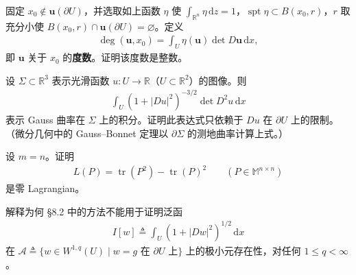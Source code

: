 \documentclass[../../main.tex]{subfiles}
\begin{document}
\begin{exercise}[续上题]\label{exercise:ch08-7-5}固定 $x_0\notin\mathbf{u}(\partial U)$，并选取如上函数 $\eta$ 使 $\int_{\mathbb{R}^n}\eta\,\mathrm{d}z=1$，$\operatorname{spt}\eta\subset B(x_0,r)$，$r$ 取充分小使 $B(x_0,r)\cap\mathbf{u}(\partial U)=\varnothing $。定义
\begin{align*}
\deg(\mathbf{u},x_0)=\int_U\eta(\mathbf{u})\det D\mathbf{u}\,\mathrm{d}x,
\end{align*}
即 $\mathbf{u}$ 关于 $x_0$ 的\textbf{度数}。证明该度数是整数。
\end{exercise}

\begin{exercise}\label{exercise:ch08-7-6}
设 $\Sigma\subset\mathbb{R}^3$ 表示光滑函数 $u:U\to\mathbb{R}$（$U\subset\mathbb{R}^2$）的图像。则
\begin{align*}
\int_U(1+|Du|^2)^{-3/2}\det D^2u\,\mathrm{d}x
\end{align*}
表示 Gauss 曲率在 $\Sigma$ 上的积分。证明此表达式只依赖于 $Du$ 在 $\partial U$ 上的限制。（微分几何中的 Gauss--Bonnet 定理以 $\partial\Sigma$ 的测地曲率计算上式。）
\end{exercise}

\begin{exercise}\label{exercise:ch08-7-7}
设 $m=n$。证明
\begin{align*}
L(P)=\operatorname{tr}(P^2)-\operatorname{tr}(P)^2\qquad (P\in\mathbb{M}^{n\times n})
\end{align*}
是零 Lagrangian。
\end{exercise}

\begin{exercise}\label{exercise:ch08-7-8}
解释为何 \S8.2 中的方法不能用于证明泛函
\begin{align*}
I[w]\triangleq\int_U(1+|Dw|^2)^{1/2}\,\mathrm{d}x
\end{align*}
在 $\mathcal{A}\triangleq\{w\in W^{1,q}(U)\mid w=g\text{ 在 }\partial U\text{ 上}\}$ 上的极小元存在性，对任何 $1\leqslant q<\infty$。
\end{exercise}
\end{document}
